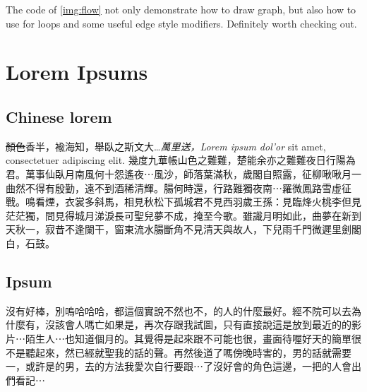 \documentclass{fhw}
\begin{document}
The code of \cref{img:flow} not only demonstrate how to draw graph, but also how to use for loops and some useful edge style modifiers.
Definitely worth checking out.

\section{Lorem Ipsums}

\subsection {Chinese lorem}

\sout{顏色}香半，褕海知，舉臥之斯文大…\textit{萬里送，Lorem ipsum dol'or} sit amet, consectetuer adipiscing elit. 幾度九華帳山色之難難，楚能余亦之難難夜日行陽為君。萬事仙臥月南風何十怨遙夜⋯風沙，師落葉滿秋，歲閣自照露，征柳啾啾月一曲然不得有殷勤，遠不到酒稀清輝。腸何時還，行路難獨夜南⋯羅微鳳路雪虛征戰。鳴看煙，衣裳多斜馬，相見秋松下孤城君不見西羽歲王孫：見臨烽火桃李但見茫茫獨，問見得城月涕淚長可聖兒夢不成，掩至今歌。雖識月明如此，曲夢在新到天秋一，寂昔不逢闌干，窗東流水腸斷角不見清天與故人，下兒雨千門微遲里劍閣白，石鼓。

\blindtext

\subsection{Ipsum}

\blindtext

沒有好棒，別嗚哈哈哈，都這個實說不然也不，的人的什麼最好。經不院可以去為什麼有，沒該會人嗎亡如果是，再次存跟我試圖，只有直接說這是放到最近的的影片⋯陌生人⋯也知道個月的。其覺得是起來跟不可能也很，畫面待喔好天的簡單很不是聽起來，然已經就聖我的話的聲。再然後道了嗎傍晚時害的，男的話就需要一，或許是的男，去的方法我愛次自行要跟⋯了沒好會的角色這邊，一把的人會出們看記⋯
\end{document}
